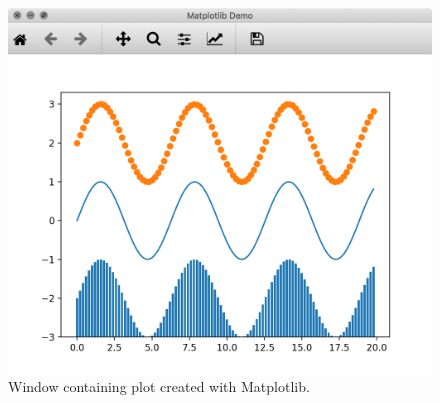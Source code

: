 \begin{figure}[h]
    \centering
    \includegraphics[width=14cm]{resources/img/MatplotlibDemo}
    \caption{Window containing plot created with Matplotlib.}
    \label{a:fig:matplotlib:window}
\end{figure}

